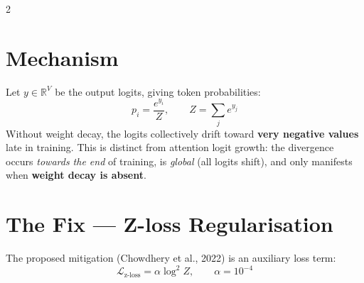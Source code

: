 \documentclass[12pt,a4paper]{article}
\begin{document}
\begin{multicols}{2}

\section{Mechanism}

Let $y \in \mathbb{R}^V$ be the output logits, giving token probabilities:
\[
p_i = \frac{e^{y_i}}{Z}, \qquad Z = \sum_j e^{y_j}
\]
Without weight decay, the logits collectively drift toward \textbf{very negative values}
late in training.
This is distinct from attention logit growth: the divergence occurs
\emph{towards the end} of training, is \emph{global} (all logits shift), and only
manifests when \textbf{weight decay is absent}.

\columnbreak

\section{The Fix — Z-loss Regularisation}

The proposed mitigation (Chowdhery et al., 2022) is an auxiliary loss term:
\[
\mathcal{L}_{\text{z-loss}} = \alpha \log^2 Z, \qquad \alpha = 10^{-4}
\]


\end{multicols}

\vspace{6pt}
\end{document}
